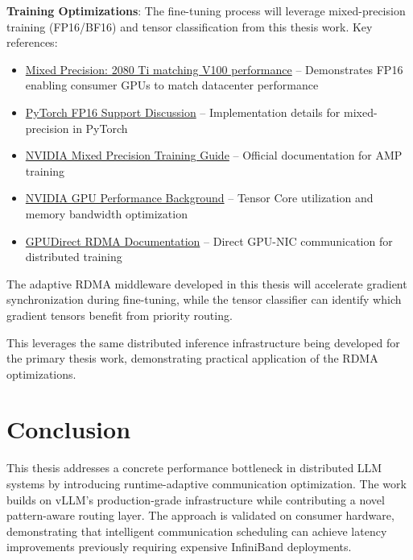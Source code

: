 \documentclass[10pt,letterpaper]{article}
\begin{document}
\textbf{Training Optimizations}: The fine-tuning process will leverage mixed-precision training (FP16/BF16) and tensor classification from this thesis work. Key references:
\begin{itemize}[noitemsep]
    \item \href{https://synced.medium.com/two-lines-of-code-to-use-a-2080ti-to-achieve-what-was-previously-only-possible-on-a-v100-a9b94c590e46}{Mixed Precision: 2080 Ti matching V100 performance} -- Demonstrates FP16 enabling consumer GPUs to match datacenter performance
    \item \href{https://github.com/pytorch/pytorch/issues/3748}{PyTorch FP16 Support Discussion} -- Implementation details for mixed-precision in PyTorch
    \item \href{https://docs.nvidia.com/deeplearning/performance/mixed-precision-training/index.html}{NVIDIA Mixed Precision Training Guide} -- Official documentation for AMP training
    \item \href{https://docs.nvidia.com/deeplearning/performance/dl-performance-gpu-background/index.html}{NVIDIA GPU Performance Background} -- Tensor Core utilization and memory bandwidth optimization
    \item \href{https://docs.nvidia.com/cuda/gpudirect-rdma/index.html}{GPUDirect RDMA Documentation} -- Direct GPU-NIC communication for distributed training
\end{itemize}

The adaptive RDMA middleware developed in this thesis will accelerate gradient synchronization during fine-tuning, while the tensor classifier can identify which gradient tensors benefit from priority routing.

This leverages the same distributed inference infrastructure being developed for the primary thesis work, demonstrating practical application of the RDMA optimizations.

\section{Conclusion}

This thesis addresses a concrete performance bottleneck in distributed LLM systems by introducing runtime-adaptive communication optimization. The work builds on vLLM's production-grade infrastructure while contributing a novel pattern-aware routing layer. The approach is validated on consumer hardware, demonstrating that intelligent communication scheduling can achieve latency improvements previously requiring expensive InfiniBand deployments.
\end{document}
